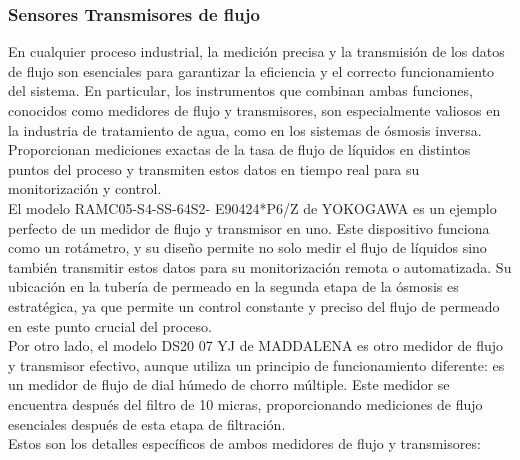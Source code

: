 \subsubsection{Sensores Transmisores de flujo} \label{sec:sensor_flujo}

En cualquier proceso industrial, la medición precisa y la transmisión de los datos de flujo son esenciales para garantizar la eficiencia y el correcto funcionamiento del sistema. En particular, los instrumentos que combinan ambas funciones, conocidos como medidores de flujo y transmisores, son especialmente valiosos en la industria de tratamiento de agua, como en los sistemas de ósmosis inversa. Proporcionan mediciones exactas de la tasa de flujo de líquidos en distintos puntos del proceso y transmiten estos datos en tiempo real para su monitorización y control.\\

El modelo RAMC05-S4-SS-64S2- E90424*P6/Z de YOKOGAWA es un ejemplo perfecto de un medidor de flujo y transmisor en uno. Este dispositivo funciona como un rotámetro, y su diseño permite no solo medir el flujo de líquidos sino también transmitir estos datos para su monitorización remota o automatizada. Su ubicación en la tubería de permeado en la segunda etapa de la ósmosis es estratégica, ya que permite un control constante y preciso del flujo de permeado en este punto crucial del proceso.\\

Por otro lado, el modelo DS20 07 YJ de MADDALENA es otro medidor de flujo y transmisor efectivo, aunque utiliza un principio de funcionamiento diferente: es un medidor de flujo de dial húmedo de chorro múltiple. Este medidor se encuentra después del filtro de 10 micras, proporcionando mediciones de flujo esenciales después de esta etapa de filtración.\\



Estos son los detalles específicos de ambos medidores de flujo y transmisores:\\



